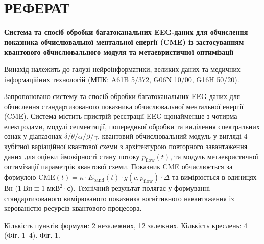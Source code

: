 \documentclass[12pt,a4paper]{article}
\begin{document}
\section{РЕФЕРАТ}\label{ux440ux435ux444ux435ux440ux430ux442}



\textbf{Система та спосіб обробки багатоканальних EEG-даних для обчислення показника обчислювальної ментальної енергії (CME) із застосуванням квантового обчислювального модуля та метаевристичної оптимізації}



Винахід належить до галузі нейроінформатики, великих даних та медичних інформаційних технологій (МПК: A61B 5/372, G06N 10/00, G16H 50/20).



Запропоновано систему та спосіб обробки багатоканальних EEG-даних для обчислення стандартизованого показника обчислювальної ментальної енергії (CME). Система містить пристрій реєстрації EEG щонайменше з чотирма електродами, модулі сегментації, попередньої обробки та виділення спектральних ознак у діапазонах \(\delta/\theta/\alpha/\beta/\gamma\), квантовий обчислювальний модуль у вигляді 4-кубітної варіаційної квантової схеми з архітектурою повторного завантаження даних для оцінки ймовірності стану потоку \(p_{\text{flow}}(t)\), та модуль метаевристичної оптимізації параметрів квантової схеми. Показник CME обчислюється за формулою \(\text{CME}(t) = \kappa \cdot E_{\text{band}}(t) \cdot g(c, p_{\text{flow}}) \cdot \Delta\) та вимірюється в одиницях Вн (\(1\;\text{Вн} \equiv 1\;\text{мкВ}^2 \cdot \text{с}\)). Технічний результат полягає у формуванні стандартизованого вимірюваного показника когнітивного навантаження із керованістю ресурсів квантового процесора.



Кількість пунктів формули: 2 незалежних, 12 залежних. Кількість креслень: 4 (Фіг. 1--4). Фіг. 1.
\end{document}

